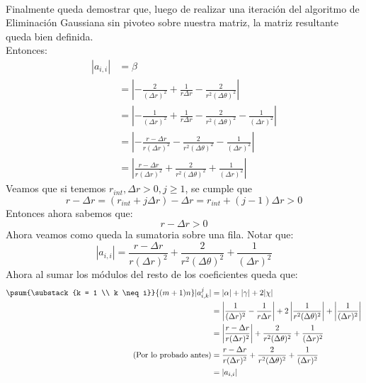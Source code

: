 \documentclass[12pt]{article}
\newcommand{\sub}[3]{\ensuremath{#1_{#2,#3}}}
\begin{document}
\paragraph{} Finalmente queda demostrar que, luego de realizar una iteración del algoritmo de Eliminación Gaussiana sin pivoteo sobre nuestra matriz, la matriz resultante queda bien definida. \\ %
Entonces:
\[\begin{split}
  | a_{i,i} | & = \beta \\
              & = \left \vert - \frac{2}{(\Delta r)^2} + \frac{1}{r \Delta r} - \frac{2}{r^2 (\Delta \theta)^2} \right \vert \\
              & = \left \vert - \frac{1}{(\Delta r)^2} + \frac{1}{r \Delta r} - \frac{2}{r^2 (\Delta \theta)^2} - \frac{1}{(\Delta r)^2} \right \vert \\
              & = \left \vert - \frac{r - \Delta r}{r (\Delta r)^2} - \frac{2}{r^2 (\Delta \theta)^2} - \frac{1}{(\Delta r)^2} \right \vert \\
              & = \left \vert \frac{r - \Delta r}{r (\Delta r)^2} + \frac{2}{r^2 (\Delta \theta)^2} + \frac{1}{(\Delta r)^2} \right \vert
\end{split}\]
Veamos que si tenemos \(r_{int}, \Delta r > 0, j \geq 1\), se cumple que
\[
  r - \Delta r = (r_{int} + j \Delta r) - \Delta r = r_{int} + (j - 1) \Delta r > 0
\]
Entonces ahora sabemos que:
\[
  r - \Delta r > 0
\]
Ahora veamos como queda la sumatoria sobre una fila. Notar que:  
\[
  | \sub{a}{i}{i} | = \frac{r - \Delta r}{r (\Delta r)^2} + \frac{2}{r^2 (\Delta \theta)^2} + \frac{1}{(\Delta r)^2}
\]
Ahora al sumar los módulos del resto de los coeficientes queda que:
\[\begin{split}
  \psum{\substack{k = 1 \\ k \neq i}}{(m+1)n} |\sub{a}{i}{k}^{j}| & = |\alpha| + |\gamma| + 2 |\chi| \\
                                                                  & = \left \vert \frac{1}{(\Delta r)^2} - \frac{1}{r \Delta r} \right \vert + 2 \left \vert \frac{1}{r^2 (\Delta \theta)^2} \right \vert + \left \vert \frac{1}{(\Delta r)^2} \right \vert \\
                                                                       & = \left \vert \frac{r - \Delta r}{r (\Delta r)^2} \right \vert + \frac{2}{r^2 (\Delta \theta)^2} + \frac{1}{(\Delta r)^2} \\
                                                                       \text{(Por lo probado antes)}
                                                                       & = \frac{r - \Delta r}{r (\Delta r)^2} + \frac{2}{r^2 (\Delta \theta)^2} + \frac{1}{(\Delta r)^2} \\
                                                                       & = | \sub{a}{i}{i} |
\end{split}\] %
\end{document}
